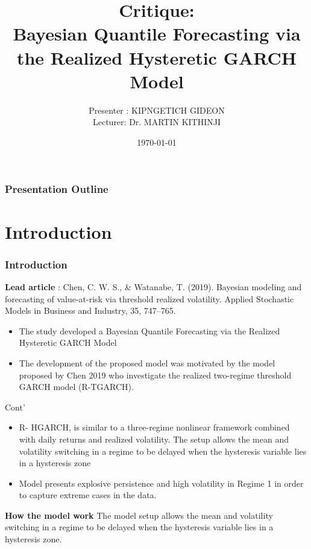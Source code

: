 \documentclass[unknownkeysallowed]{beamer}
\title[Article Critique]{\textbf{Critique}: \\Bayesian Quantile Forecasting via the Realized Hysteretic GARCH Model}
\author[KIPNGETICH GIDEON]{\large Presenter : KIPNGETICH GIDEON\\ \vspace{1cm}Lecturer: Dr. MARTIN KITHINJI}
\date{\today}
\begin{document}
	\begin{frame}
		\titlepage
	\end{frame}
	\begin{frame}
		\frametitle{\textbf{Presentation Outline}}
		\tableofcontents{}
	\end{frame}
	
	\section{Introduction}
	\begin{frame}
		\frametitle{\textbf{Introduction}}
		\textbf{Lead article} : Chen, C. W. S., \& Watanabe, T. (2019). Bayesian modeling and forecasting
		of value-at-risk via threshold realized volatility. Applied
		Stochastic Models in Business and Industry, 35, 747–765.
		\begin{itemize}
			\item The study developed a Bayesian Quantile Forecasting via the Realized Hysteretic GARCH Model
			\item The development of the proposed model was motivated by the model proposed by Chen 2019 who investigate the realized two-regime threshold GARCH model (R-TGARCH).
	\end{itemize}	
	\end{frame}
\begin{frame}{Cont'}
	\begin{itemize}
		\item R- HGARCH, is
		similar to a three-regime nonlinear framework combined with daily returns
		and realized volatility. The setup allows the mean and volatility switching in a
		regime to be delayed when the hysteresis variable lies in a hysteresis zone
		\item Model presents explosive persistence and high volatility in Regime 1 in order to capture extreme cases in the data.
		
    \end{itemize}
\textbf{How the model work} The model setup allows the mean and volatility switching in a regime to be delayed when the hysteresis variable lies in a hysteresis zone.
\end{frame}
\end{document}
